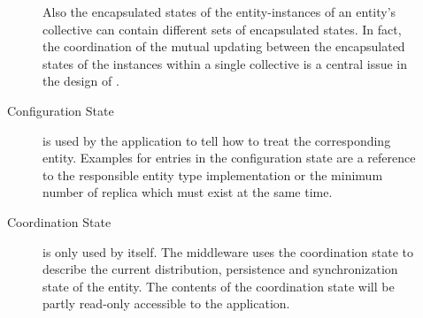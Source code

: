 \documentclass[a4paper, 10pt]{book}
\begin{document}
\begin{description}
\begin{description}
                                Also the encapsulated states of the entity-instances of an
                                entity's collective can contain different sets of encapsulated
                                states. In fact, the coordination of the mutual updating between
                                the encapsulated states of the instances within a single
                                collective is a central issue in the design of \SYNEIGHT.
                            \item[Configuration State] is used by the application to tell \SYNEIGHT
                                how to treat the corresponding entity. Examples for entries in the
                                configuration state are a reference to the responsible entity type
                                implementation or the minimum number of replica which must exist
                                at the same time.
                            \item[Coordination State] is only used by \SYNEIGHT itself. The
                                middleware uses the coordination state to describe the current
                                distribution, persistence and synchronization state of the
                                entity. The contents of the coordination state will be partly
                                read-only accessible to the application. 
                        \end{description}
                \end{description}
\end{document}
